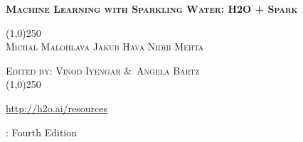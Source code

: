 

%
%
\usepackage{tabularx}
\usepackage{booktabs}
\usepackage{forest}
\usepackage{url}
\usepackage{longtable}
\def\UrlBreaks{\do\/\do-\do_\do.}



    \thispagestyle{empty} %

    \begin{center}
        \textsc{\large\bf{Machine Learning with Sparkling Water: H2O + Spark}}

        \bigskip
        \line(1,0){250}  %
        \\
        \bigskip
        \textsc{\small{Michal Malohlava\hspace{20pt} Jakub Hava\hspace{20pt} Nidhi Mehta}}

        \textsc{\small{Edited by: Vinod Iyengar \&\ Angela Bartz}}
        \\
        \bigskip
        \line(1,0){250}  %


        {\url{http://h2o.ai/resources}}

        \bigskip
        \monthname \hspace{1pt}  \the\year: Fourth Edition
        \\%
        \bigskip
    \end{center}

    \newpage
    \null\vfill %

    \thispagestyle{empty}%


